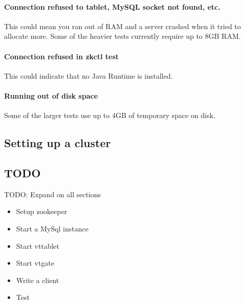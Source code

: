 \paragraph{Connection refused to tablet, MySQL socket not found, etc.}\hypertarget{connection-refused-to-tablet-mysql-socket-not-found-etc}{}\label{connection-refused-to-tablet-mysql-socket-not-found-etc}

This could mean you ran out of RAM and a server crashed when it tried to allocate more.
Some of the heavier tests currently require up to 8GB RAM.

\paragraph{Connection refused in zkctl test}\hypertarget{connection-refused-in-zkctl-test}{}\label{connection-refused-in-zkctl-test}

This could indicate that no Java Runtime is installed.

\paragraph{Running out of disk space}\hypertarget{running-out-of-disk-space}{}\label{running-out-of-disk-space}

Some of the larger tests use up to 4GB of temporary space on disk.

\subsection{Setting up a cluster}\hypertarget{setting-up-a-cluster}{}\label{setting-up-a-cluster}

\subsection{TODO}\hypertarget{TODO}{}\label{TODO}
TODO: Expand on all sections
\begin{itemize}
\item  Setup zookeeper
\item  Start a MySql instance
\item  Start vttablet
\item  Start vtgate
\item  Write a client
\item  Test
\end{itemize}

